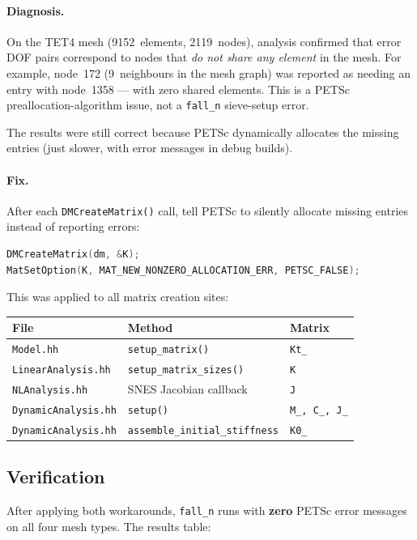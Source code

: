 \paragraph{Diagnosis.}
On the TET4 mesh (9152~elements, 2119~nodes), analysis confirmed that error
DOF pairs correspond to nodes that \emph{do not share any element} in the
mesh.  For example, node~172 (9~neighbours in the mesh graph) was reported as
needing an entry with node~1358 --- with zero shared elements.  This is a
PETSc preallocation-algorithm issue, not a \texttt{fall\_n} sieve-setup error.

The results were still correct because PETSc dynamically allocates the missing
entries (just slower, with error messages in debug builds).

\paragraph{Fix.}
After each \texttt{DMCreateMatrix()} call, tell PETSc to silently allocate
missing entries instead of reporting errors:
\begin{lstlisting}[language=C++]
DMCreateMatrix(dm, &K);
MatSetOption(K, MAT_NEW_NONZERO_ALLOCATION_ERR, PETSC_FALSE);
\end{lstlisting}
This was applied to all matrix creation sites:
\begin{center}
\small
\begin{tabular}{lll}
  \toprule
  File & Method & Matrix \\
  \midrule
  \texttt{Model.hh}           & \texttt{setup\_matrix()}               & \texttt{Kt\_} \\
  \texttt{LinearAnalysis.hh}  & \texttt{setup\_matrix\_sizes()}        & \texttt{K} \\
  \texttt{NLAnalysis.hh}      & SNES Jacobian callback                & \texttt{J} \\
  \texttt{DynamicAnalysis.hh} & \texttt{setup()}                       & \texttt{M\_, C\_, J\_} \\
  \texttt{DynamicAnalysis.hh} & \texttt{assemble\_initial\_stiffness} & \texttt{K0\_} \\
  \bottomrule
\end{tabular}
\end{center}


\subsection{Verification}

After applying both workarounds, \texttt{fall\_n} runs with \textbf{zero}
PETSc error messages on all four mesh types.  The results table:

